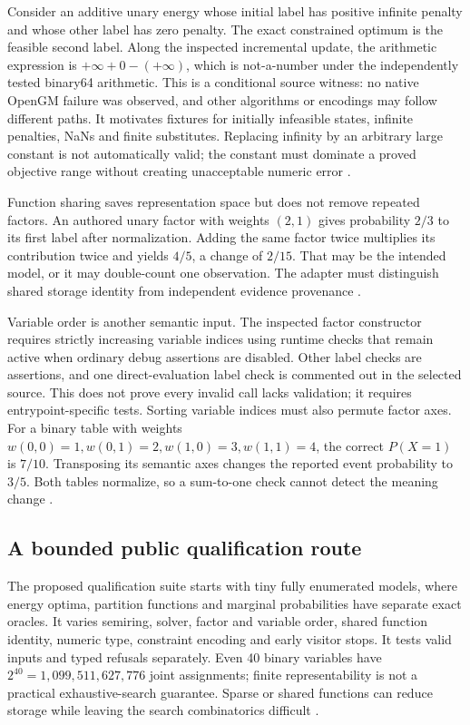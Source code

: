 Consider an additive unary energy whose initial label has positive infinite
penalty and whose other label has zero penalty. The exact constrained
optimum is the feasible second label. Along the inspected incremental
update, the arithmetic expression is $+\infty+0-(+\infty)$, which is
not-a-number under the independently tested binary64 arithmetic. This is a
conditional source witness: no native OpenGM failure was observed, and
other algorithms or encodings may follow different paths. It motivates
fixtures for initially infeasible states, infinite penalties, NaNs and
finite substitutes. Replacing infinity by an arbitrary large constant is
not automatically valid; the constant must dominate a proved objective
range without creating unacceptable numeric error
\cite{exec24_opengm_source,exec24_opengm_choice}.

Function sharing saves representation space but does not remove repeated
factors. An authored unary factor with weights $(2,1)$ gives probability
$2/3$ to its first label after normalization. Adding the same factor twice
multiplies its contribution twice and yields $4/5$, a change of $2/15$.
That may be the intended model, or it may double-count one observation.
The adapter must distinguish shared storage identity from independent
evidence provenance \cite{exec24_opengm_paper,exec24_opengm_choice}.

Variable order is another semantic input. The inspected factor constructor
requires strictly increasing variable indices using runtime checks that
remain active when ordinary debug assertions are disabled. Other label
checks are assertions, and one direct-evaluation label check is commented
out in the selected source. This does not prove every invalid call lacks
validation; it requires entrypoint-specific tests. Sorting variable indices
must also permute factor axes. For a binary table with weights
$w(0,0)=1,w(0,1)=2,w(1,0)=3,w(1,1)=4$, the correct $P(X=1)$ is $7/10$.
Transposing its semantic axes changes the reported event probability to
$3/5$. Both tables normalize, so a sum-to-one check cannot detect the
meaning change \cite{exec24_opengm_source,exec24_opengm_choice}.

\subsection{A bounded public qualification route}
The proposed qualification suite starts with tiny fully enumerated models,
where energy optima, partition functions and marginal probabilities have
separate exact oracles. It varies semiring, solver, factor and variable
order, shared function identity, numeric type, constraint encoding and
early visitor stops. It tests valid inputs and typed refusals separately.
Even 40 binary variables have $2^{40}=1{,}099{,}511{,}627{,}776$ joint
assignments; finite representability is not a practical exhaustive-search
guarantee. Sparse or shared functions can reduce storage while leaving
the search combinatorics difficult \cite{exec24_opengm_choice}.

